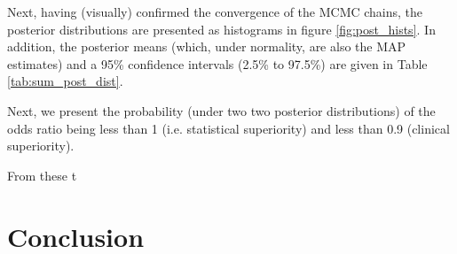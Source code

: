 \documentclass[fleqn,10pt]{SelfArx} %
\begin{document}
Next, having (visually) confirmed the convergence of the MCMC chains, the posterior distributions are presented as histograms in figure \ref{fig:post_hists}. In addition, the posterior means (which, under normality, are also the MAP estimates) and a 95\% confidence intervals (2.5\% to 97.5\%) are given in Table \ref{tab:sum_post_dist}.

Next, we present the probability (under two two posterior distributions) of the odds ratio being less than 1 (i.e. statistical superiority) and less than 0.9 (clinical superiority).

From these t


\section{Conclusion}





\end{document}
